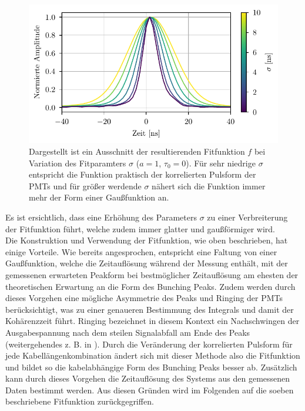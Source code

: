 \begin{figure}[h]
    \centering
    \includegraphics{images/Analysis/corr_pulses_diff_sigma.pdf}
    \caption{Dargestellt ist ein Ausschnitt der resultierenden Fitfunktion $f$ bei Variation des Fitparamters $\sigma$ ($a=1$, $\tau_0=0$). Für sehr niedrige $\sigma$ entspricht die Funktion praktisch der korrelierten Pulsform der PMTs und für größer werdende $\sigma$ nähert sich die Funktion immer mehr der Form einer Gaußfunktion an.}
    \label{fig:Fitfuktion für verschiedene sigma}
\end{figure}
Es ist ersichtlich, dass eine Erhöhung des Parameters $\sigma$ zu einer Verbreiterung der Fitfunktion führt, welche zudem immer glatter und gaußförmiger wird. \\

Die Konstruktion und Verwendung der Fitfunktion, wie oben beschrieben, hat einige Vorteile. 
Wie bereits angesprochen, entspricht eine Faltung von einer Gaußfunktion, welche die Zeitauflösung während der Messung enthält, mit der gemessenen erwarteten Peakform bei bestmöglicher Zeitauflösung am ehesten der theoretischen Erwartung an die Form des Bunching Peaks. 
Zudem werden durch dieses Vorgehen eine mögliche Asymmetrie des Peaks und Ringing der PMTs berücksichtigt, was zu einer genaueren Bestimmung des Integrals und damit der Kohärenzzeit führt. 
Ringing bezeichnet in diesem Kontext ein Nachschwingen der Ausgabespannung nach dem steilen Signalabfall am Ende des Peaks (weitergehendes z. B. in \cite{RelatedDocumentsPhotomultiplier}). 
Durch die Veränderung der korrelierten Pulsform für jede Kabellängenkombination ändert sich mit dieser Methode also die Fitfunktion und bildet so die kabelabhängige Form des Bunching Peaks besser ab. 
Zusätzlich kann durch dieses Vorgehen die Zeitauflösung des Systems aus den gemessenen Daten bestimmt werden. 
Aus diesen Gründen wird im Folgenden auf die soeben beschriebene Fitfunktion zurückgegriffen. 

